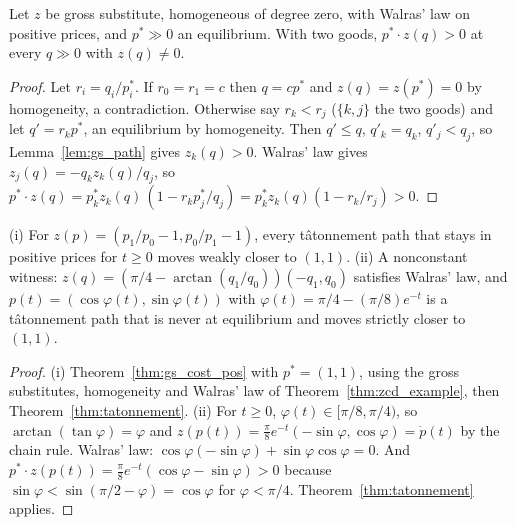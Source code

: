 \begin{theorem}
\label{thm:gs_cost_pos}
\leanok
{}
Let $z$ be gross substitute, homogeneous of degree zero, with Walras' law on positive prices, and $p^* \gg 0$ an
equilibrium. With two goods, $p^* \cdot z(q) > 0$ at every $q \gg 0$ with $z(q) \ne 0$.
\end{theorem}
\begin{proof}
\leanok
Let $r_i = q_i / p^*_i$. If $r_0 = r_1 = c$ then $q = c p^*$ and $z(q) = z(p^*) = 0$ by homogeneity, a contradiction.
Otherwise say $r_k < r_j$ ($\{k, j\}$ the two goods) and let $q' = r_k p^*$, an equilibrium by homogeneity. Then
$q' \le q$, $q'_k = q_k$, $q'_j < q_j$, so Lemma~\ref{lem:gs_path} gives $z_k(q) > 0$. Walras' law gives
$z_j(q) = -q_k z_k(q) / q_j$, so
$p^* \cdot z(q) = p^*_k z_k(q)\,(1 - r_k p^*_j / q_j) = p^*_k z_k(q)(1 - r_k / r_j) > 0$.
\end{proof}

\begin{theorem}
\label{thm:zcd_tatonnement}
\leanok
{}
(i) For $z(p) = (p_1/p_0 - 1, p_0/p_1 - 1)$, every tâtonnement path that stays in positive prices for $t \ge 0$ moves
weakly closer to $(1,1)$. (ii) A nonconstant witness: $z(q) = (\pi/4 - \arctan(q_1/q_0))(-q_1, q_0)$ satisfies Walras'
law, and $p(t) = (\cos\varphi(t), \sin\varphi(t))$ with $\varphi(t) = \pi/4 - (\pi/8)e^{-t}$ is a tâtonnement path that
is never at equilibrium and moves strictly closer to $(1,1)$.
\end{theorem}
\begin{proof}
\leanok
(i) Theorem~\ref{thm:gs_cost_pos} with $p^* = (1,1)$, using the gross substitutes, homogeneity and Walras' law of
Theorem~\ref{thm:zcd_example}, then Theorem~\ref{thm:tatonnement}. (ii) For $t \ge 0$, $\varphi(t) \in [\pi/8, \pi/4)$,
so $\arctan(\tan\varphi) = \varphi$ and $z(p(t)) = \tfrac{\pi}{8}e^{-t}(-\sin\varphi, \cos\varphi) = \dot p(t)$ by the chain
rule. Walras' law: $\cos\varphi(-\sin\varphi) + \sin\varphi\cos\varphi = 0$. And
$p^* \cdot z(p(t)) = \tfrac{\pi}{8}e^{-t}(\cos\varphi - \sin\varphi) > 0$ because $\sin\varphi < \sin(\pi/2 - \varphi) =
\cos\varphi$ for $\varphi < \pi/4$. Theorem~\ref{thm:tatonnement} applies.
\end{proof}

